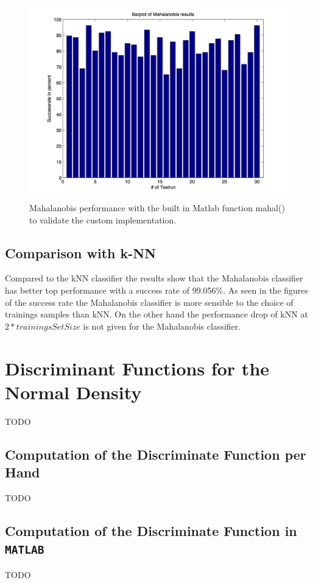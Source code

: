 \documentclass[subfigure,epsfig,fleqn,amssmb,float,caption,ausarbeitung]{scrartcl}
\begin{document}
\begin{figure}
	\centering
	\includegraphics[scale=0.75]{img/mahalanobis_results_matlab_covmat.jpg}
	\caption{Mahalanobis performance with the built in Matlab function mahal() to validate the custom implementation.}
\end{figure}
\subsection{Comparison with k-NN}
\label{sec:MahalanobisComparison}

Compared to the kNN classifier the results show that the Mahalanobis classifier has better top performance with a success rate of 99.056\%. As seen in the figures of the success rate the Mahalanobis classifier is more sensible to the choice of trainings samples than kNN. On the other hand the performance drop of kNN at $2*trainingsSetSize$ is not given for the Mahalanobis classifier. 


\section{Discriminant Functions for the Normal Density}
\label{sec:DiscriminantFunctions}

TODO


\subsection{Computation of the Discriminate Function per Hand}
\label{sec:Hand}

TODO


\subsection{Computation of the Discriminate Function in \texttt{MATLAB}}
\label{sec:Matlab}

TODO


\pagebreak


\fontsize{9}{10pt}


\end{document}
